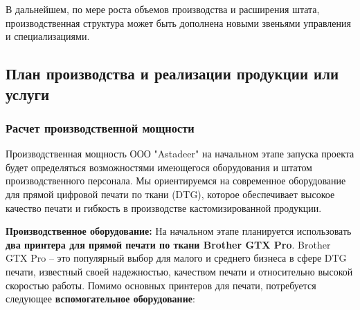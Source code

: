 В дальнейшем, по мере роста объемов производства и расширения штата, производственная структура может быть дополнена новыми звеньями управления и специализациями.

\subsection{План производства и реализации продукции или услуги}

\subsubsection{Расчет производственной мощности}

Производственная мощность ООО "Astadeer" на начальном этапе запуска проекта будет определяться возможностями имеющегося оборудования и штатом производственного персонала.  Мы ориентируемся на современное оборудование для прямой цифровой печати по ткани (DTG), которое обеспечивает высокое качество печати и гибкость в производстве кастомизированной продукции.

\vspace{0.3cm}

\textbf{Производственное оборудование:}  На начальном этапе планируется использовать \textbf{два принтера для прямой печати по ткани Brother GTX Pro}.  Brother GTX Pro – это популярный выбор для малого и среднего бизнеса в сфере DTG печати, известный своей надежностью, качеством печати и относительно высокой скоростью работы.  Помимо основных принтеров для печати, потребуется следующее \textbf{вспомогательное оборудование}:

